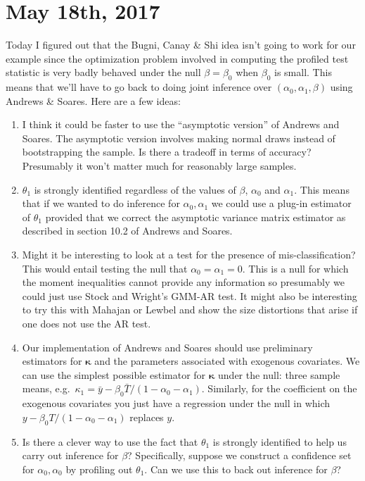 \documentclass[12pt]{article}
\begin{document}
\section{May 18th, 2017}
Today I figured out that the Bugni, Canay \& Shi idea isn't going to work for our example since the optimization problem involved in computing the profiled test statistic is very badly behaved under the null $\beta = \beta_0$ when $\beta_0$ is small.
This means that we'll have to go back to doing joint inference over $(\alpha_0, \alpha_1, \beta)$ using Andrews \& Soares.
Here are a few ideas:
\begin{enumerate}
  \item I think it could be faster to use the ``asymptotic version'' of Andrews and Soares.
    The asymptotic version involves making normal draws instead of bootstrapping the sample.
    Is there a tradeoff in terms of accuracy?
    Presumably it won't matter much for reasonably large samples.
  \item $\theta_1$ is strongly identified regardless of the values of $\beta$, $\alpha_0$ and $\alpha_1$.
    This means that if we wanted to do inference for $\alpha_0, \alpha_1$ we could use a plug-in estimator of $\theta_1$ provided that we correct the asymptotic variance matrix estimator as described in section 10.2 of Andrews and Soares.
  \item Might it be interesting to look at a test for the presence of mis-classification? This would entail testing the null that $\alpha_0 = \alpha_1 = 0$.
    This is a null for which the moment inequalities cannot provide any information so presumably we could just use Stock and Wright's GMM-AR test.
    It might also be interesting to try this with Mahajan or Lewbel and show the size distortions that arise if one does not use the AR test.
  \item Our implementation of Andrews and Soares should use preliminary estimators for $\boldsymbol{\kappa}$ and the parameters associated with exogenous covariates.
    We can use the simplest possible estimator for $\boldsymbol{\kappa}$ under the null: three sample means, e.g.\ $\kappa_1 = \bar{y} - \beta_0 \bar{T}/(1 - \alpha_0 - \alpha_1)$.
    Similarly, for the coefficient on the exogenous covariates you just have a regression under the null in which $y - \beta_0 T/(1 - \alpha_0 - \alpha_1)$ replaces $y$.
  \item Is there a clever way to use the fact that $\theta_1$ is strongly identified to help us carry out inference for $\beta$?
   Specifically, suppose we construct a confidence set for $\alpha_0, \alpha_0$ by profiling out $\theta_1$. 
   Can we use this to back out inference for $\beta$?
\end{enumerate}
\end{document}
